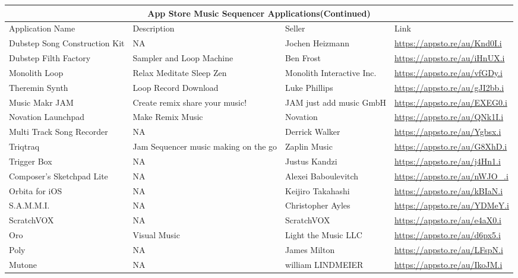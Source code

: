  \newpage
 \pagestyle{fancy}
 \fancyfoot{}
 \fancyfoot[C]{\thepage}

 \begin{tabular}{ |p{3cm}||p{3.5cm}|p{3.5cm}|p{3.5cm}||}
  \hline
  \multicolumn{4}{|c|}{App Store Music Sequencer Applications(Continued)} \\
  \hline
  Application Name   & Description  & Seller & Link\\
  \hline

 Dubstep Song Construction Kit &NA & Jochen Heizmann &
  \url{https://appsto.re/au/Knd0I.i}\\

 Dubstep Filth Factory & Sampler and Loop Machine & Ben Frost &
  \url{https://appsto.re/au/iHnUX.i}\\

 Monolith Loop & Relax Meditate Sleep Zen & Monolith Interactive Inc.&
  \url{https://appsto.re/au/vfGDy.i}\\

 Theremin Synth & Loop Record Download & Luke Phillips &
 \url{https://appsto.re/au/gJI2bb.i}\\

 Music Makr JAM & Create remix share your music! & JAM just add music GmbH &
 \url{https://appsto.re/au/EXEG0.i}\\

 Novation Launchpad & Make Remix Music & Novation &
 \url{https://appsto.re/au/QNk1I.i}\\

 Multi Track Song Recorder & NA & Derrick Walker &
 \url{https://appsto.re/au/Ygbsx.i}\\

 Triqtraq & Jam Sequencer music making on the go & Zaplin Music &
 \url{https://appsto.re/au/G8XhD.i}\\

 Trigger Box & NA & Justus Kandzi &
 \url{https://appsto.re/au/j4Hn1.i}\\

 Composer's Sketchpad Lite & NA & Alexei Baboulevitch &
 \url{https://appsto.re/au/nWJO_.i}\\

 Orbita for iOS & NA & Keijiro Takahashi&
 \url{https://appsto.re/au/kBIaN.i}\\

 S.A.M.M.I. & NA & Christopher Ayles &
 \url{https://appsto.re/au/YDMeY.i}\\

 ScratchVOX & NA & ScratchVOX &
 \url{https://appsto.re/au/e4aX0.i}\\

 Oro & Visual Music & Light the Music LLC &
   \url{https://appsto.re/au/d6px5.i}\\

 Poly & NA & James Milton &
   \url{https://appsto.re/au/LFspN.i}\\

 Mutone & NA & william LINDMEIER &
   \url{https://appsto.re/au/IkoJM.i}\\

  \hline
 \end{tabular}

